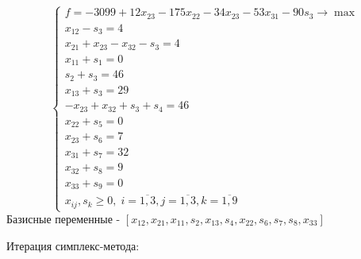 \documentclass[a4paper]{article}
\theoremstyle{definition}
\theoremstyle{remark}
\begin{document}
\[\begin{cases}
		f = -3099 + 12x_{23}- 175 x_{22} - 34 x_{23} - 53 x_{31} - 90 s_3\to \max \\
		x_{12}-s_3 = 4                                                            \\
		x_{21} + x_{23} - x_{32} - s_3 = 4                                        \\
		x_{11} + s_{1} =  0                                                       \\
		s_{2} + s_3 =  46                                                         \\
		x_{13} + s_{3} =  29                                                      \\
		-x_{23} + x_{32} + s_{3} + s_4 =  46                                      \\
		x_{22} + s_{5} =  0                                                       \\
		x_{23} + s_{6} =  7                                                       \\
		x_{31} + s_{7} =  32                                                      \\
		x_{32} + s_{8} =  9                                                       \\
		x_{33} + s_{9} =  0                                                       \\
		x_{ij}, s_k \geqslant 0, \; i = \overline{1, 3}, j = \overline{1, 3}, k = \overline{1, 9}
	\end{cases}\]
Базисные переменные - $[x_{12}, x_{21}, x_{11}, s_2, x_{13}, s_4, x_{22}, s_6, s_7, s_8, x_{33}]$

Итерация симплекс-метода:
\end{document}
